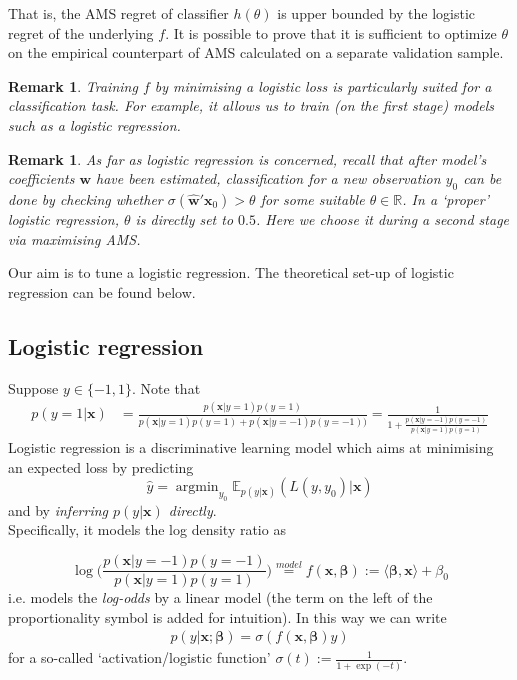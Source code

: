 \documentclass[]{article}
\DeclareMathOperator*{\argmin}{argmin}
\newcommand{\x}{\mathbf{x}}
\newcommand{\bbeta}{\boldsymbol \beta}
\newtheorem{remark}[theorem]{Remark}
\begin{document}
That is, the AMS regret of classifier $h(\theta)$ is upper bounded by the logistic regret of the underlying $f$. It is possible to prove that it is sufficient to optimize $\theta$ on the empirical counterpart of AMS calculated on a separate validation sample. 


\begin{remark}
Training $f$ by minimising a logistic loss is particularly suited for a classification task. For example, it allows us to train (on the first stage) models such as a logistic regression. 
\end{remark}
\begin{remark}
As far as logistic regression is concerned, recall that after model's coefficients $\bm{w}$ have been estimated, classification for a new observation $y_0$ can be done by checking whether  $\sigma(\hat{\bm{w}}'\bm{x}_0)>\theta$ for some suitable $\theta \in \mathbb{R}$. In a `proper' logistic regression, $\theta$ is directly set to $0.5$. Here we choose it during a second stage via maximising AMS.
\end{remark}

Our aim is to tune a logistic regression. The theoretical set-up of logistic regression can be found below.

\subsection{Logistic regression}


Suppose $y\in \{-1,1\}$. Note that
\begin{align}
p(y=1|\x)&=\frac{p(\x|y=1)p(y=1)}{p(\x|y=1)p(y=1)+p(\x|y=-1)p(y=-1))} = \frac{1}{1+\frac{p(\x|y=-1)p(y=-1)}{p(\x|y=1)p(y=1)}}
\end{align}
Logistic regression is a discriminative learning model which aims at minimising an expected loss by predicting 
$$\hat{y}=\argmin_{y_0}\mathbb{E}_{p(y|\x)}(L(y,y_0)|\x)$$
and by \textit{inferring $p(y|\x)$ directly}. \\


\noindent Specifically, it models the log density ratio as 

$$\log\Big(\frac{p(\x|y=-1)p(y=-1)}{p(\x|y=1)p(y=1)}\Big)\overset{model}{=}f(\x,\bbeta):=\langle \bbeta,\x \rangle+\beta_0$$ 
i.e. models the \textit{log-odds}  by a linear model (the term on the left of the proportionality symbol is added for intuition). In this way we can write 
\begin{align}
p(y|\x;\bbeta)=\sigma(f(\x,\bbeta)y)
\end{align}
for a so-called `activation/logistic function' $\sigma(t):=\frac{1}{1+\exp(-t)}$.  \\
\end{document}
